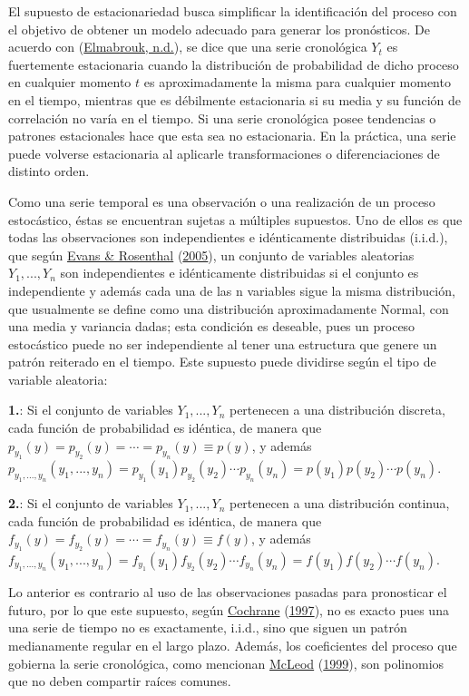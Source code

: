 \documentclass[
]{article}
\begin{document}
El supuesto de estacionariedad busca simplificar la identificación del
proceso con el objetivo de obtener un modelo adecuado para generar los
pronósticos. De acuerdo con
(\protect\hyperlink{ref-definicion_estocastico}{Elmabrouk, n.d.}), se
dice que una serie cronológica \(Y_t\) es fuertemente estacionaria
cuando la distribución de probabilidad de dicho proceso en cualquier
momento \(t\) es aproximadamente la misma para cualquier momento en el
tiempo, mientras que es débilmente estacionaria si su media y su función
de correlación no varía en el tiempo. Si una serie cronológica posee
tendencias o patrones estacionales hace que esta sea no estacionaria. En
la práctica, una serie puede volverse estacionaria al aplicarle
transformaciones o diferenciaciones de distinto orden.

Como una serie temporal es una observación o una realización de un
proceso estocástico, éstas se encuentran sujetas a múltiples supuestos.
Uno de ellos es que todas las observaciones son independientes e
idénticamente distribuidas (i.i.d.), que según
\protect\hyperlink{ref-definicion_iid}{Evans \& Rosenthal}
(\protect\hyperlink{ref-definicion_iid}{2005}), un conjunto de variables
aleatorias \(Y_1,...,Y_n\) son independientes e idénticamente
distribuidas si el conjunto es independiente y además cada una de las n
variables sigue la misma distribución, que usualmente se define como una
distribución aproximadamente Normal, con una media y variancia dadas;
esta condición es deseable, pues un proceso estocástico puede no ser
independiente al tener una estructura que genere un patrón reiterado en
el tiempo. Este supuesto puede dividirse según el tipo de variable
aleatoria:

\textbf{1.}: Si el conjunto de variables \(Y_1,...,Y_n\) pertenecen a
una distribución discreta, cada función de probabilidad es idéntica, de
manera que \(p_{y_1}(y)=p_{y_2}(y)=\cdots=p_{y_n}(y)\equiv p(y)\), y
además
\(p_{y_1,...,y_n}(y_1,...,y_n)=p_{y_1}(y_1)p_{y_2}(y_2)\cdots p_{y_n}(y_n)=p(y_1)p(y_2)\cdots p(y_n)\).

\textbf{2.}: Si el conjunto de variables \(Y_1,...,Y_n\) pertenecen a
una distribución continua, cada función de probabilidad es idéntica, de
manera que \(f_{y_1}(y)=f_{y_2}(y)=\cdots=f_{y_n}(y)\equiv f(y)\), y
además
\(f_{y_1,...,y_n}(y_1,...,y_n)=f_{y_1}(y_1)f_{y_2}(y_2)\cdots f_{y_n}(y_n)=f(y_1)f(y_2)\cdots f(y_n)\).

Lo anterior es contrario al uso de las observaciones pasadas para
pronosticar el futuro, por lo que este supuesto, según
\protect\hyperlink{ref-Cochrane}{Cochrane}
(\protect\hyperlink{ref-Cochrane}{1997}), no es exacto pues una una
serie de tiempo no es exactamente, i.i.d., sino que siguen un patrón
medianamente regular en el largo plazo. Además, los coeficientes del
proceso que gobierna la serie cronológica, como mencionan
\protect\hyperlink{ref-invertible_estacionario3}{McLeod}
(\protect\hyperlink{ref-invertible_estacionario3}{1999}), son polinomios
que no deben compartir raíces comunes.
\end{document}
